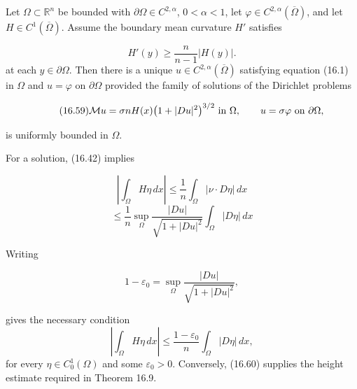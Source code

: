 \begin{theorem}\label{gilbarg-trudinger.thm.16.9.conditional-dirichlet-solvability}
Let $\Omega\subset\mathbb R^n$ be bounded with $\partial\Omega\in C^{2,\alpha}$, $0<\alpha<1$, let $\varphi\in C^{2,\alpha}(\overline\Omega)$, and let $H\in C^1(\overline\Omega)$. Assume the boundary mean curvature $H'$ satisfies

\begin{equation}
H'(y)\ge\frac n{n-1}|H(y)|.
\tag{16.58}
\end{equation}
at each $y\in\partial\Omega$. Then there is a unique
$u\in C^{2,\alpha}(\overline\Omega)$ satisfying
equation (16.1) in $\Omega$ and $u=\varphi$ on $\partial\Omega$ provided the family of solutions of the Dirichlet
problems

\begin{equation}\tag{16.59}
\mathcal{M} u = \sigma nH(x)\bigl(1+|Du|^2\bigr)^{3/2}\ \text{in }\Omega,\qquad u=\sigma\varphi\ \text{on }\partial\Omega,
\end{equation}

is uniformly bounded in $\Omega$.
\end{theorem}

For a solution, (16.42) implies

\[
\left|\int_\Omega H\eta\,dx\right|\leq \frac{1}{n}\int_\Omega |\nu\cdot D\eta|\,dx
\]
\[
\leq \frac{1}{n}\sup_\Omega \frac{|Du|}{\sqrt{1+|Du|^2}}\int_\Omega |D\eta|\,dx
\]

Writing

\[
1-\varepsilon_0=\sup_\Omega \frac{|Du|}{\sqrt{1+|Du|^2}},
\]

gives the necessary condition
\begin{equation}\tag{16.60}
\left|\int_\Omega H\eta\,dx\right|\leq \frac{1-\varepsilon_0}{n}\int_\Omega |D\eta|\,dx,
\end{equation}
for every $\eta\in C_0^1(\Omega)$ and some $\varepsilon_0>0$.
Conversely, (16.60) supplies the height estimate required in Theorem 16.9.

